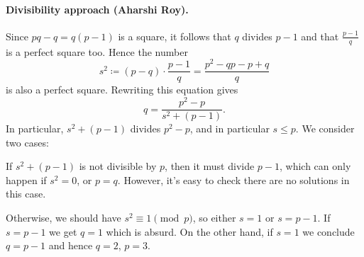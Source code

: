 \documentclass[11pt]{scrartcl}
\begin{document}
\paragraph{Divisibility approach (Aharshi Roy).}
Since $pq-q = q(p-1)$ is a square, it follows that $q$ divides $p-1$
and that $\frac{p-1}{q}$ is a perfect square too.
Hence the number
\[ s^2 \coloneqq (p-q) \cdot \frac{p-1}{q} = \frac{p^2-qp-p+q}{q} \]
is also a perfect square.
Rewriting this equation gives
\[ q = \frac{p^2-p}{s^2 + (p-1)}. \]
In particular, $s^2 + (p-1)$ divides $p^2-p$, and in particular $s \leq p$.
We consider two cases:
\begin{itemize}
  \ii If $s^2+(p-1)$ is not divisible by $p$, then it must divide $p-1$,
  which can only happen if $s^2 = 0$, or $p = q$.
  However, it's easy to check there are no solutions in this case.

  \ii Otherwise, we should have $s^2 \equiv 1 \pmod p$,
  so either $s = 1$ or $s = p-1$.
  If $s = p-1$ we get $q=1$ which is absurd.
  On the other hand, if $s=1$ we conclude $q = p-1$ and hence $q=2$, $p=3$.
\end{itemize}
\pagebreak
\end{document}
